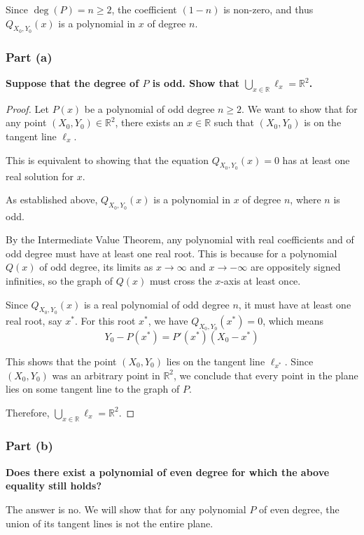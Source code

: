 \documentclass[12pt,a4paper]{article}
\theoremstyle{definition}
\begin{document}
Since $\deg(P) = n \geq 2$, the coefficient $(1-n)$ is non-zero, and thus $Q_{X_0, Y_0}(x)$ is a polynomial in $x$ of degree $n$.

\subsubsection*{Part (a)}

\textbf{Suppose that the degree of $P$ is odd. Show that $\bigcup_{x\in\mathbb{R}}\ell_x = \mathbb{R}^2$.}

\begin{proof}
Let $P(x)$ be a polynomial of odd degree $n \geq 2$. We want to show that for any point $(X_0, Y_0) \in \mathbb{R}^2$, there exists an $x \in \mathbb{R}$ such that $(X_0, Y_0)$ is on the tangent line $\ell_x$.

This is equivalent to showing that the equation $Q_{X_0, Y_0}(x) = 0$ has at least one real solution for $x$.

As established above, $Q_{X_0, Y_0}(x)$ is a polynomial in $x$ of degree $n$, where $n$ is odd.

By the Intermediate Value Theorem, any polynomial with real coefficients and of odd degree must have at least one real root. This is because for a polynomial $Q(x)$ of odd degree, its limits as $x \to \infty$ and $x \to -\infty$ are oppositely signed infinities, so the graph of $Q(x)$ must cross the $x$-axis at least once.

Since $Q_{X_0, Y_0}(x)$ is a real polynomial of odd degree $n$, it must have at least one real root, say $x^*$. For this root $x^*$, we have $Q_{X_0, Y_0}(x^*) = 0$, which means
\[Y_0 - P(x^*) = P'(x^*)(X_0 - x^*)\]

This shows that the point $(X_0, Y_0)$ lies on the tangent line $\ell_{x^*}$. Since $(X_0, Y_0)$ was an arbitrary point in $\mathbb{R}^2$, we conclude that every point in the plane lies on some tangent line to the graph of $P$.

Therefore, $\bigcup_{x \in \mathbb{R}} \ell_x = \mathbb{R}^2$.
\end{proof}

\subsubsection*{Part (b)}

\textbf{Does there exist a polynomial of even degree for which the above equality still holds?}

The answer is no. We will show that for any polynomial $P$ of even degree, the union of its tangent lines is not the entire plane.
\end{document}
